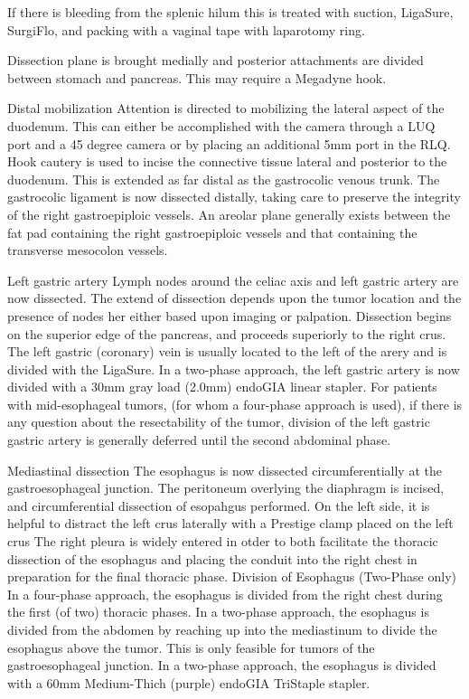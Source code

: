 \documentclass[
]{book}
\begin{document}
If there is bleeding from the splenic hilum this is treated with suction, LigaSure, SurgiFlo, and packing with a vaginal tape with laparotomy ring.

Dissection plane is brought medially and posterior attachments are divided between stomach and pancreas. This may require a Megadyne hook.

Distal mobilization
Attention is directed to mobilizing the lateral aspect of the duodenum. This can either be accomplished with the camera through a LUQ port and a 45 degree camera or by placing an additional 5mm port in the RLQ. Hook cautery is used to incise the connective tissue lateral and posterior to the duodenum. This is extended as far distal as the gastrocolic venous trunk. The gastrocolic ligament is now dissected distally, taking care to preserve the integrity of the right gastroepiploic vessels. An areolar plane generally exists between the fat pad containing the right gastroepiploic vessels and that containing the transverse mesocolon vessels.

Left gastric artery
Lymph nodes around the celiac axis and left gastric artery are now dissected. The extend of dissection depends upon the tumor location and the presence of nodes her either based upon imaging or palpation. Dissection begins on the superior edge of the pancreas, and proceeds superiorly to the right crus. The left gastric (coronary) vein is usually located to the left of the arery and is divided with the LigaSure. In a two-phase approach, the left gastric artery is now divided with a 30mm gray load (2.0mm) endoGIA linear stapler. For patients with mid-esophageal tumors, (for whom a four-phase approach is used), if there is any question about the resectability of the tumor, division of the left gastric gastric artery is generally deferred until the second abdominal phase.

Mediastinal dissection
The esophagus is now dissected circumferentially at the gastroesophageal junction. The peritoneum overlying the diaphragm is incised, and circumferential dissection of esopahgus performed. On the left side, it is helpful to distract the left crus laterally with a Prestige clamp placed on the left crus The right pleura is widely entered in otder to both facilitate the thoracic dissection of the esophagus and placing the conduit into the right chest in preparation for the final thoracic phase. Division of Esophagus (Two-Phase only) In a four-phase approach, the esophagus is divided from the right chest during the first (of two) thoracic phases. In a two-phase approach, the esophagus is divided from the abdomen by reaching up into the mediastinum to divide the esophagus above the tumor. This is only feasible for tumors of the gastroesophageal junction. In a two-phase approach, the esophagus is divided with a 60mm Medium-Thich (purple) endoGIA TriStaple stapler.
\end{document}
